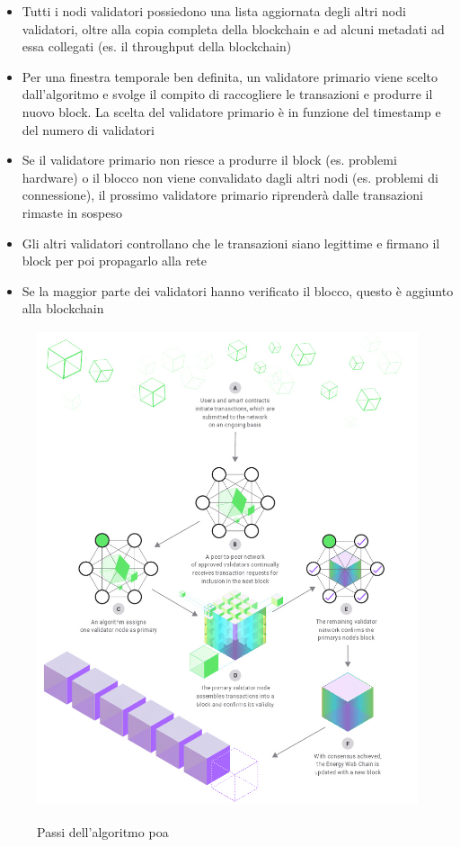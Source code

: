 \documentclass[12pt, letterpaper, twoside]{article}
\begin{document}
\begin{itemize}
    \item Tutti i nodi validatori possiedono una lista aggiornata degli altri nodi validatori, oltre alla copia completa della blockchain e ad alcuni metadati ad essa collegati (es. il throughput della blockchain)
    \item Per una finestra temporale ben definita, un validatore primario viene scelto dall'algoritmo e svolge il compito di raccogliere le transazioni e produrre il nuovo block. La scelta del validatore primario è in funzione del timestamp e del numero di validatori
    \item Se il validatore primario non riesce a produrre il block (es. problemi hardware) o il blocco non viene convalidato dagli altri nodi (es. problemi di connessione), il prossimo validatore primario riprenderà dalle transazioni rimaste in sospeso
    \item Gli altri validatori controllano che le transazioni siano legittime e firmano il block per poi propagarlo alla rete
    \item Se la maggior parte dei validatori hanno verificato il blocco, questo è aggiunto alla blockchain
\end{itemize}
 
\newpage
 
\begin{figure}[!h]
    \includegraphics[height=14cm,keepaspectratio]{ew-poa}
    \centering
    \label{ew-poa}
    \caption{Passi dell'algoritmo \gls{poa} \cite{img:ew-poa}}
\end{figure}
 
\end{document}
